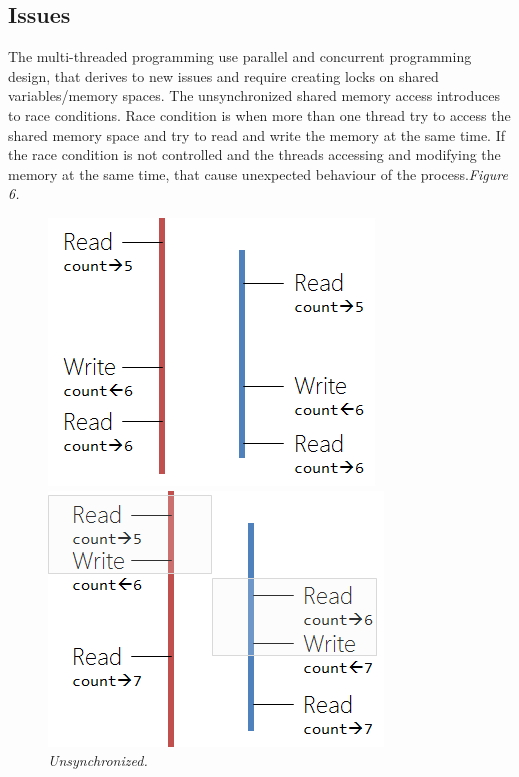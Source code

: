 \documentclass[12pt]{article}
\begin{document}
\subsection{Issues}
The multi-threaded programming use parallel and concurrent programming design, that derives to new issues and require creating locks on shared variables/memory spaces. The unsynchronized shared memory access introduces to race conditions. Race condition is when more than one thread try to access the shared memory space and try to read and write the memory at the same time. If the race condition is not controlled and the threads accessing and modifying the memory at the same time, that cause unexpected behaviour of the process.\textit{\color{gray}Figure 6.}

\begin{figure}[h!]
  \centering
  \begin{minipage}[h!]{0.4\textwidth}
    \includegraphics[width=\textwidth]{Pictures/issue1.png}
    \caption{\textit{\color{gray}Unsynchronized\cite{Tutorialspoint}.}}
  \end{minipage}
  \hfill
  \begin{minipage}[h!]{0.4\textwidth}
    \includegraphics[width=\textwidth]{Pictures/issue2.png}

\end{minipage}
\end{figure}
\end{document}
